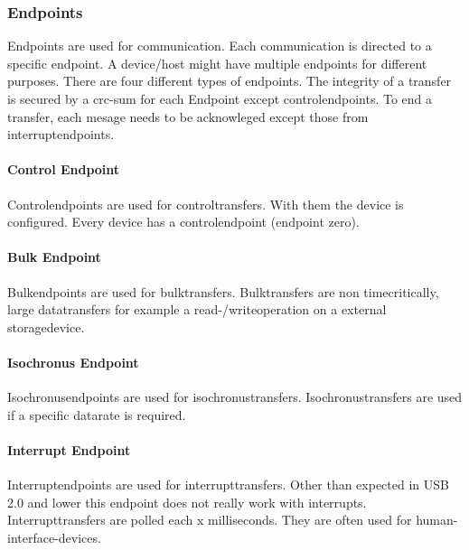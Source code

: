 \documentclass{acm_proc_article-sp}
\begin{document}
\subsubsection{Endpoints}
Endpoints are used for communication. Each communication is directed to a specific endpoint. A device/host might have multiple endpoints for different purposes. There are four different types of endpoints. The integrity of a transfer is secured by a crc-sum for each Endpoint except controlendpoints. To end a transfer, each mesage needs to be acknowleged except those from interruptendpoints.
\paragraph{Control Endpoint}
Controlendpoints are used for controltransfers. With them the device is configured. Every device has a controlendpoint (endpoint zero).
\paragraph{Bulk Endpoint}
Bulkendpoints are used for bulktransfers. Bulktransfers are non timecritically, large datatransfers for example a read-/writeoperation on a external storagedevice.
\paragraph{Isochronus Endpoint}
Isochronusendpoints are used for isochronustransfers. Isochronustransfers are used if a specific datarate is required.
\paragraph{Interrupt Endpoint}
Interruptendpoints are used for interrupttransfers. Other than expected in USB 2.0 and lower this endpoint does not really work with interrupts. Interrupttransfers are polled each x milliseconds. They are often used for human-interface-devices.
\end{document}

